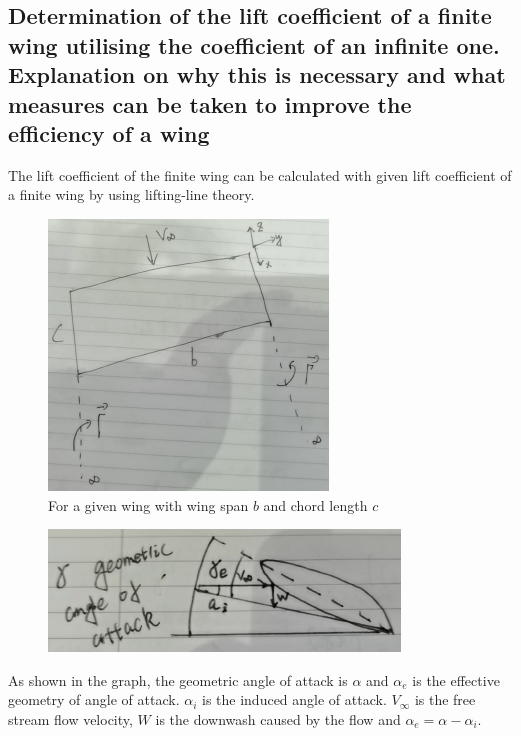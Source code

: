 \documentclass[11pt]{article}
\begin{document}
\subsection*{Determination of the lift coefficient of a finite wing utilising the coefficient of an infinite one. Explanation on why this is necessary and what measures can be taken to improve the efficiency of a wing}
The lift coefficient of the finite wing can be calculated with given lift coefficient of a finite wing by using lifting-line theory.
\begin{figure}[H]
  \centering
  \includegraphics[width = 0.35 \textwidth]{./img/diagram3.png}
  \caption{For a given wing with wing span $b$ and chord length $c$}
\end{figure}
\begin{figure}[H]
  \centering
  \includegraphics[width = 0.5 \textwidth]{./img/diagram4.png}
  \caption{}
  \label{GeometricAngleOfAttack}
\end{figure}
As shown in the graph, the geometric angle of attack is $\alpha$ and $\alpha_e$ is the effective geometry of angle of attack. $\alpha_i$ is the induced angle of attack. $V_{\infty}$ is the free stream flow velocity, $W$ is the downwash caused by the flow and $\alpha_e = \alpha - \alpha_i$. 
\end{document}
